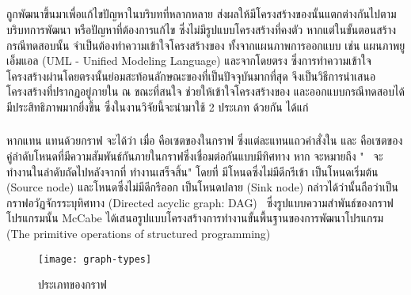 \subsection{\ProgramGraph}
\label{sec:sub:pg}

{\software} ถูกพัฒนาขึ้นมาเพื่อแก้ไขปัญหาในบริบทที่หลากหลาย ส่งผลให้มีโครงสร้างของ{\sourcecode}นั้นแตกต่างกันไปตามบริบทการพัฒนา
หรือปัญหาที่ต้องการแก้ไข ซึ่งไม่มีรูปแบบโครงสร้างที่คงตัว หากแต่ในขั้นตอนสร้างกรณีทดสอบนั้น\FirstTimeDefine{\tester}{\testerEN}
จำเป็นต้องทำความเข้าใจโครงสร้างของ{\software} ทั้งจากแผนภาพการออกแบบ เช่น แผนภาพยูเอ็มแอล (UML - Unified Modeling Language) 
และจาก{\sourcecode}โดยตรง ซึ่งการทำความเข้าใจโครงสร้างผ่าน{\sourcecode}โดยตรงนั้นย่อมสะท้อนลักษณะของ{\software}ที่เป็นปัจจุบันมากที่สุด
{\ProgramGraph} จึงเป็นวิธีการนำเสนอโครงสร้างที่ปรากฏอยู่ภายใน{\software} ณ ขณะที่สนใจ ช่วยให้{\tester}เข้าใจโครงสร้างของ{\software}
และออกแบบกรณีทดสอบได้มีประสิทธิภาพมากยิ่งขึ้น ซึ่งในงานวิจัยนี้จะนำ{\ProgramGraph}มาใช้ 2 ประเภท ด้วยกัน ได้แก่

\subsubsection{\FirstTimeDefine{\cfg}{\cfgen}}
\label{sec:sub:sub:cfg}

หากแทน{\software}  แทนด้วยกราฟ  จะได้ว่า  เมื่อ  
คือเซตของ{\Node}ในกราฟ ซึ่งแต่ละ{\Node}แทนแถวคำสั่งใน{\sourcecode} และ  
คือเซตของคู่ลำดับโหนดที่มีความสัมพันธ์กันภายในกราฟซึ่งเชื่อมต่อกันแบบมีทิศทาง หาก  จะหมายถึง 
"\Node\  จะทำงานในลำดับถัดไปหลังจากที่  ทำงานเสร็จสิ้น" \cite{Jorgensen2013} 
โดยที่  มีโหนดซึ่งไม่มีดีกรีเข้า  เป็นโหนดเริ่มต้น (Source node) 
และโหนดซึ่งไม่มีดีกรีออก  เป็นโหนดปลาย (Sink node) 
กล่าวได้ว่า{\cfg}นั้นถือว่าเป็นกราฟอวัฏจักรระบุทิศทาง (Directed acyclic graph: DAG) \cite{Bang-Jensen2009}\ 
ซึ่งรูปแบบความสำพันธ์ของกราฟโปรแกรมนั้น McCabe \cite{Watson1996} 
ได้เสนอรูปแบบโครงสร้างการทำงานขั้นพื้นฐานของการพัฒนาโปรแกรม (The primitive operations of structured programming) 
\figref{fig:graphtype}

\begin{figure}[ht!]
    \centering
    \texttt{[image: graph-types]}
    \caption{ประเภทของกราฟ}
    \label{fig:graphtype}
\end{figure}

